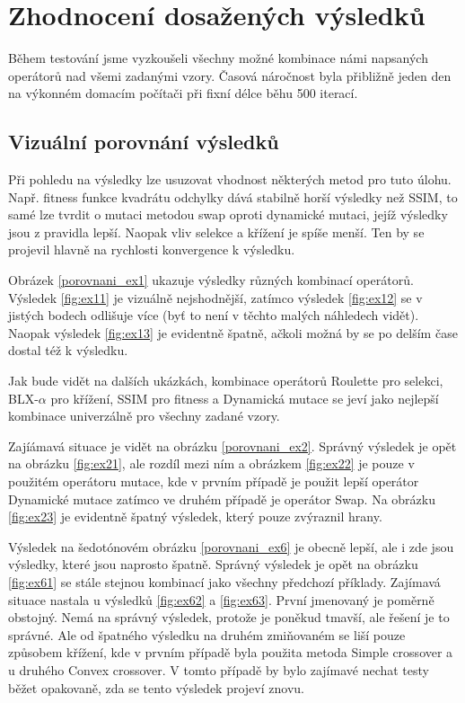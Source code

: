 \documentclass[a4paper,11pt,titlepage]{scrartcl}
\begin{document}
\section{Zhodnocení dosažených výsledků}
Během testování jsme vyzkoušeli všechny možné kombinace námi napsaných operátorů nad všemi zadanými vzory. Časová náročnost byla přibližně jeden den na výkonném domacím počítači při fixní délce běhu 500 iterací. 

\subsection{Vizuální porovnání výsledků}
Při pohledu na výsledky lze usuzovat vhodnost některých metod pro tuto úlohu. Např. fitness funkce kvadrátu odchylky dává stabilně horší výsledky než SSIM, to samé lze tvrdit o mutaci metodou swap oproti dynamické mutaci, jejíž výsledky jsou z pravidla lepší. Naopak vliv selekce a křížení je spíše menší. Ten by se projevil hlavně na rychlosti konvergence k výsledku.


Obrázek \ref{porovnani_ex1} ukazuje výsledky různých kombinací operátorů. Výsledek \ref{fig:ex11} je vizuálně nejshodnější, zatímco výsledek \ref{fig:ex12} se v jistých bodech odlišuje více (byť to není v těchto malých náhledech vidět). Naopak výsledek \ref{fig:ex13} je evidentně špatně, ačkoli možná by se po delším čase dostal též k výsledku.

Jak bude vidět na dalších ukázkách, kombinace operátorů Roulette pro selekci, BLX-$\alpha$ pro křížení, SSIM pro fitness a Dynamická mutace se jeví jako nejlepší kombinace univerzálně pro všechny zadané vzory.

Zajíámavá situace je vidět na obrázku \ref{porovnani_ex2}. Správný výsledek je opět na obrázku \ref{fig:ex21}, ale rozdíl mezi ním a obrázkem \ref{fig:ex22} je pouze v použitém operátoru mutace, kde v prvním případě je použit lepší operátor Dynamické mutace zatímco ve druhém případě je operátor Swap. Na obrázku \ref{fig:ex23} je evidentně špatný výsledek, který pouze zvýraznil hrany.

Výsledek na šedotónovém obrázku \ref{porovnani_ex6} je obecně lepší, ale i zde jsou výsledky, které jsou naprosto špatně. Správný výsledek je opět na obrázku \ref{fig:ex61} se stále stejnou kombinací jako všechny předchozí příklady. Zajímavá situace nastala u výsledků \ref{fig:ex62} a \ref{fig:ex63}. První jmenovaný je poměrně obstojný. Nemá na správný výsledek, protože je poněkud tmavší, ale řešení je to správné. Ale od špatného výsledku na druhém zmiňovaném se liší pouze způsobem křížení, kde v prvním případě byla použita metoda Simple crossover a u druhého Convex crossover. V tomto případě by bylo zajímavé nechat testy běžet opakovaně, zda se tento výsledek projeví znovu.
\end{document}
